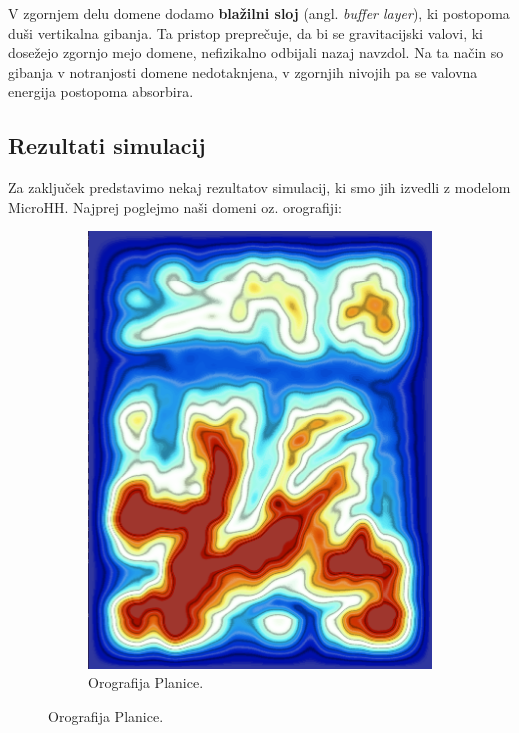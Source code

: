 \documentclass[mat2, tisk]{fmfdelo}
\begin{document}
V zgornjem delu domene dodamo \textbf{blažilni sloj} (angl. \emph{buffer layer}),
ki postopoma duši vertikalna gibanja. Ta pristop preprečuje, da bi se 
gravitacijski valovi, ki dosežejo zgornjo mejo domene, nefizikalno 
odbijali nazaj navzdol. Na ta način so gibanja v notranjosti domene 
nedotaknjena, v zgornjih nivojih pa se valovna energija postopoma 
absorbira.

\subsection{Rezultati simulacij}

Za zaključek predstavimo nekaj rezultatov simulacij, ki smo jih izvedli z modelom MicroHH.
Najprej poglejmo naši domeni oz. orografiji:
\begin{figure}[h!]
  \centering
  \begin{subfigure}[b]{0.48\textwidth}
    \centering
    \includegraphics[width=\textwidth]{rezultati/dem_planica.png}
    \caption{Orografija Planice.}
    \label{fig:planica}

\end{subfigure}
\end{figure}
\end{document}
